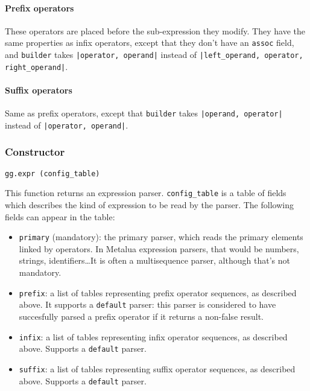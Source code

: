 

\paragraph{Prefix operators}
These operators are placed before the sub-expression they modify. They
have the same properties as infix operators, except that they don't
have an \verb|assoc| field, and \verb|builder| takes {\tt|operator,
  operand|} instead of {\tt|left\_operand, operator, right\_operand|}.

\paragraph{Suffix operators}
Same as prefix operators, except that \verb|builder| takes
{\tt|operand, operator|} instead of {\tt|operator, operand|}.

\subsubsection{Constructor}

\begin{verbatim}
gg.expr (config_table)
\end{verbatim}

This function returns an expression parser. \verb|config_table|
is a table of fields which describes the kind of expression to be
read by the parser. The following fields can appear in the table:

\begin{itemize}
\item\verb|primary| (mandatory): the primary parser, which reads the
  primary elements linked by operators. In Metalua expression parsers,
  that would be numbers, strings, identifiers\ldots It is often a
  multisequence parser, although that's not mandatory.
\item\verb|prefix|: a list of tables representing prefix operator
  sequences, as described above. It supports a {\tt default} parser:
  this parser is considered to have succesfully parsed a prefix
  operator if it returns a non-false result.
\item\verb|infix|: a list of tables representing infix operator
  sequences, as described above. Supports a {\tt default} parser.
\item\verb|suffix|: a list of tables representing suffix operator
  sequences, as described above. Supports a {\tt default} parser.
\end{itemize}

